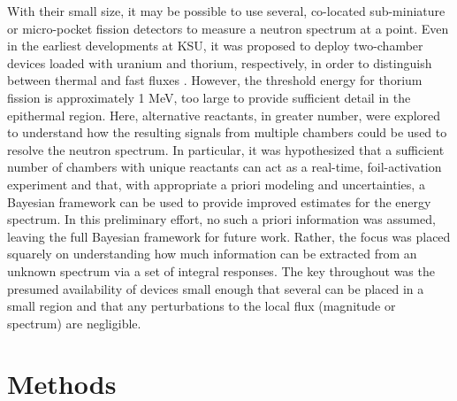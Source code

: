 \documentclass[journal]{IEEEtran}
\begin{document}
With their small size, it may be possible to use several, co-located sub-miniature or micro-pocket fission detectors to measure a neutron spectrum at a point. Even in the earliest developments at KSU, it was proposed to deploy two-chamber devices loaded with uranium and thorium, respectively, in order to distinguish between thermal and fast fluxes \cite{mcgregor2005micro}.  However, the threshold energy for thorium fission is approximately 1 MeV, too large to provide sufficient detail in the epithermal region. Here, alternative reactants, in greater number, were explored to understand how the resulting signals from multiple chambers could be used to resolve the neutron spectrum.  In particular, it was hypothesized that  a sufficient number of chambers with unique reactants can act as a real-time, foil-activation experiment and that, with appropriate a priori modeling and uncertainties, a Bayesian framework can be used to provide improved estimates for the energy spectrum.  In this preliminary effort, no such a priori information was assumed, leaving the full Bayesian framework for future work.  Rather, the focus was placed squarely on understanding how much information can be extracted from an unknown spectrum via a set of integral responses. The key throughout was the presumed availability of devices small enough that several can be placed in a small region and that any perturbations to the local flux (magnitude or spectrum) are negligible.

\section{Methods}
\end{document}
